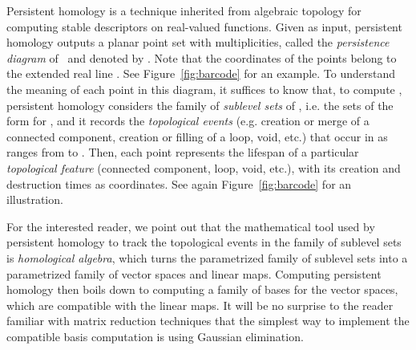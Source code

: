 \documentclass[11pt]{article}
\begin{document}
\begin{figure*}
\centering
{}
\caption{\label{fig:barcode}Sketch of persistent homology: 
(a)~the horizontal lines are the boundaries of sublevel sets , which are colored in decreasing shades of grey.
The vertical dotted lines are the boundaries of their different connected components.
For instance, a new connected component is created in the sublevel set  
when , and it is merged (destroyed) when ; its lifespan is represented by a copy of the point with coordinates
 in the persistence diagram of~ (Figure~(c)); 
(b)~a piecewise-linear approximation  (blue) of the function  (red) from sampled values; 
(c)~superposition of  (red) and  (blue), showing the partial matching of minimum cost (magenta) between the
two persistence diagrams.}
\end{figure*}


Persistent homology is a technique inherited from algebraic
topology for computing stable descriptors on real-valued
functions. Given  as input, persistent homology
outputs a planar point set with multiplicities, called the 
{\em  persistence diagram} of~ and denoted by .
Note that the coordinates of the points belong to the extended real line . 
See Figure~\ref{fig:barcode} for an example. 
To understand the meaning of each point in this diagram, it suffices to know that, to compute , 
persistent homology considers the family of {\em sublevel sets} of
, i.e. the sets of the form  for ,
  and it records the {\em topological events} (e.g. creation or merge
  of a connected component, creation or filling of a loop, void, etc.)
  that occur in  as  ranges from  to
    .  Then, each point  represents the lifespan
    of a particular {\em topological feature} (connected component,
    loop, void, etc.), with its creation and destruction times as
    coordinates. See again Figure~\ref{fig:barcode} for an
    illustration.

For the interested reader, we point out that the mathematical tool
used by persistent homology to track the topological events in the
family of sublevel sets is {\em homological algebra}, which turns the
parametrized family of sublevel sets into a parametrized family of
vector spaces and linear maps. Computing persistent homology then
boils down to computing a family of bases for the vector spaces, which
are compatible with the linear maps. It will be no surprise to the
reader familiar with matrix reduction techniques that the simplest way
to implement the compatible basis computation is using Gaussian elimination. 
\end{document}
